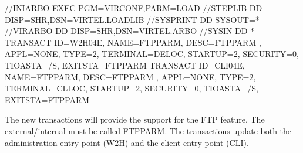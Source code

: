 \documentclass[letterpaper,10pt,english]{sphinxmanual}
\begin{document}
\begin{sphinxVerbatim}[commandchars=\\\{\}]
//INIARBO EXEC PGM=VIRCONF,PARM=LOAD
//STEPLIB  DD  DISP=SHR,DSN=VIRTEL.LOADLIB
//SYSPRINT DD  SYSOUT=*
//VIRARBO  DD  DISP=SHR,DSN=VIRTEL.ARBO
//SYSIN    DD  *
    TRANSACT ID=W2H\PYGZhy{}04E,                                             \PYGZhy{}
            NAME=FTPPARM,                                           \PYGZhy{}
            DESC=\PYGZsq{}FTPPARM   \PYGZsq{},                                      \PYGZhy{}
            APPL=\PYGZdl{}NONE\PYGZdl{},                                            \PYGZhy{}
            TYPE=2,                                                 \PYGZhy{}
            TERMINAL=DELOC,                                         \PYGZhy{}
            STARTUP=2,                                              \PYGZhy{}
            SECURITY=0,                                             \PYGZhy{}
            TIOASTA=\PYGZam{}/S,                                            \PYGZhy{}
            EXITSTA=FTPPARM
    TRANSACT ID=CLI\PYGZhy{}04E,                                             \PYGZhy{}
            NAME=FTPPARM,                                           \PYGZhy{}
            DESC=\PYGZsq{}FTPPARM   \PYGZsq{},                                      \PYGZhy{}
            APPL=\PYGZdl{}NONE\PYGZdl{},                                            \PYGZhy{}
            TYPE=2,                                                 \PYGZhy{}
            TERMINAL=CLLOC,                                         \PYGZhy{}
            STARTUP=2,                                              \PYGZhy{}
            SECURITY=0,                                             \PYGZhy{}
            TIOASTA=\PYGZam{}/S,                                            \PYGZhy{}
            EXITSTA=FTPPARM
\end{sphinxVerbatim}

\sphinxAtStartPar
The new transactions will provide the support for the FTP feature. The external/internal must be called FTPPARM. The transactions update both the administration entry point (W2H) and the client entry point (CLI).

\sphinxAtStartPar
{}

\sphinxAtStartPar
{}
\end{document}
